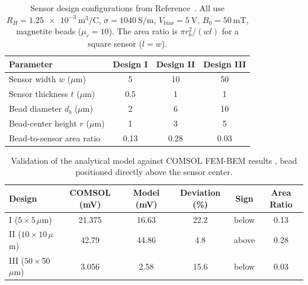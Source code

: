 \documentclass[biosensors,article,submit,pdftex,moreauthors]{Definitions/mdpi}
\begin{document}
\begin{table}[H]
\caption{Sensor design configurations from Reference~\cite{govindaraju2025}. All use
$R_H = \SI{1.25e-3}{\meter\cubed\per\coulomb}$,
$\sigma = \SI{1040}{\siemens\per\meter}$, $V_{\text{bias}} = \SI{5}{\volt}$,
$B_0 = \SI{50}{\milli\tesla}$, magnetite beads ($\mu_r = 10$). The area ratio is
$\pi r_b^2 / (w l)$ for a square sensor ($l = w$).\label{tab:designs}}
\begin{tabularx}{\textwidth}{Xccc}
\toprule
\textbf{Parameter} & \textbf{Design I} & \textbf{Design II} & \textbf{Design III} \\
\midrule
Sensor width $w$ ($\mu$m)         & 5    & 10   & 50 \\
Sensor thickness $t$ ($\mu$m)     & 0.5  & 1    & 1 \\
Bead diameter $d_b$ ($\mu$m)      & 2    & 6    & 10 \\
Bead-center height $r$ ($\mu$m)   & 1    & 3    & 5 \\
Bead-to-sensor area ratio         & 0.13 & 0.28 & 0.03 \\
\bottomrule
\end{tabularx}
\end{table}

\begin{table}[H]
\caption{Validation of the analytical model against COMSOL FEM-BEM results
\cite{govindaraju2025}, bead positioned directly above the sensor center.
\label{tab:validation}}
\begin{tabularx}{\textwidth}{Xccccc}
\toprule
\textbf{Design} & \textbf{COMSOL (mV)} & \textbf{Model (mV)} &
\textbf{Deviation (\%)} & \textbf{Sign} & \textbf{Area Ratio} \\
\midrule
I ($5\times5$\,$\mu$m)   & 21.375 & 16.63 & 22.2 & below & 0.13 \\
II ($10\times10$\,$\mu$m) & 42.79  & 44.86 & 4.8  & above & 0.28 \\
III ($50\times50$\,$\mu$m) & 3.056  & 2.58  & 15.6 & below & 0.03 \\
\bottomrule
\end{tabularx}
\end{table}
\end{document}

